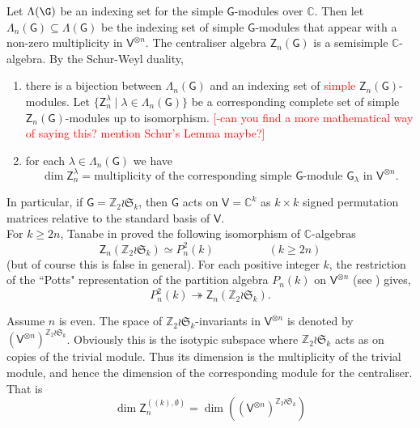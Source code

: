 \documentclass[reqno,10pt,a4paper]{amsart}
\newcommand{\C}{\mathbb{C}}
\newcommand{\Z}{\mathbb{Z}}
\newcommand{\blue}[1]{\textcolor{blue}{#1}}
\newcommand{\red}[1]{\textcolor{red}{#1}}
\newcommand{\ppm}[1]{\red{#1}}
\newcommand{\ca}[1]{\blue{#1}}
\newcommand{\kn}{k}
\newcommand{\nk}{n}  %
\newcommand{\Sym}{\mathfrak{S}}
\begin{document}
{{\mdef  \label{de:Zlam}
Let $\Lambda(\G)$ 
be an indexing set for the simple $\mathsf{G}$-modules over $\C$.
Then let    $\Lambda_\nk(\mathsf{G})\subseteq\Lambda(\mathsf{G})$ 
be the indexing set of simple $\mathsf{G}$-modules that appear with a non-zero multiplicity in $\mathsf{V}^{\otimes \nk}$. 
The centraliser algebra $\mathsf{Z}_\nk(\mathsf{G})$ is a semisimple $\C$-algebra. 
 By the Schur-Weyl duality,
\begin{enumerate}
    \item[i)] there is a bijection between $\Lambda_\nk(\mathsf{G})$ and an indexing set of
    \ppm{simple}
 $\mathsf{Z}_\nk(\mathsf{G})$-modules. 
    Let $\{\mathsf{Z}^\lambda_\nk\mid \lambda\in\Lambda_\nk(\mathsf{G})\}$ 
    be a 
    corresponding 
    complete set of simple $\mathsf{Z}_\nk(\mathsf{G})$-modules up to isomorphism.
    \ppm{[-can you find a more mathematical way of saying this? mention Schur's Lemma maybe?]}
    \item[ii)]  for each $\lambda\in\Lambda_\nk(\mathsf{G})$ we have \[\dim\mathsf{Z}^\lambda_\nk=\text{multiplicity of the corresponding simple }\mathsf{G}\text{-module } \mathsf{G}_\lambda\text{ in }\mathsf{V}^{\otimes \nk}. \]
\end{enumerate} 


\mdef 
In particular, if $\mathsf{G}=\Z_2 \wr
\Sym_\kn$, then $\mathsf{G}$ acts on $\mathsf{V}=\C^\kn$ as $\kn\times \kn$ signed permutation matrices relative to the standard basis of $\mathsf{V}$.
\\
For $\kn\geq 2\nk$, Tanabe in \cite{tanabe1997centralizer} proved the following isomorphism of $\C$-algebras  
\[
\mathsf{Z}_\nk(\Z_2 \wr
\Sym_\kn)\simeq P^2_\nk(\kn) 
\hspace{2cm}
{(\kn \geq 2\nk)}
\] 
(but of course this is false in general). %
For each positive integer $\kn$, the restriction of the ``Potts" representation of the partition algebra $P_\nk(\kn)$ on $\mathsf{V}^{\otimes \nk}$ ({see} \cite{martin2000partition}) gives,
\[
P^2_\nk(\kn)\twoheadrightarrow \mathsf{Z}_\nk(\Z_2 \wr
\Sym_\kn).
\]


\mdef 
Assume $\nk$ is even. The space of 
$\Z_2 \wr\Sym_\kn$-invariants 
in $\mathsf{V}^{\otimes \nk}$ is denoted by $\left(\mathsf{V}^{\otimes \nk}\right)^{\Z_2 \wr\Sym_\kn}$. 
Obviously this is the isotypic subspace where $\Z_2 \wr\Sym_\kn$ acts as on copies of the trivial module. 
Thus its dimension is the 
multiplicity of the trivial module, and hence the 
dimension of the corresponding module for the centraliser. That is 
\[
\dim\mathsf{Z}_{\nk}^{((\kn),\emptyset)}
=\dim ( (\mathsf{V}^{\otimes \nk})^{\Z_2 \wr\Sym_\kn})
\]


}}
\end{document}

